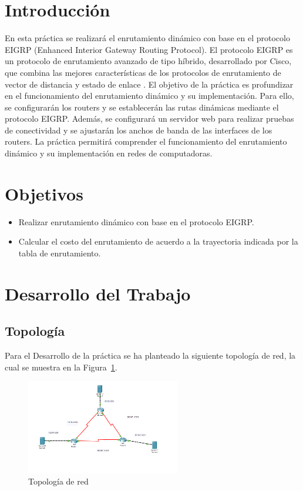 \setcounter{page}{1}


\section{Introducción}
    En esta práctica se realizará el enrutamiento dinámico con base en el protocolo EIGRP (Enhanced Interior Gateway Routing Protocol). El protocolo EIGRP es un protocolo de enrutamiento avanzado de tipo híbrido, desarrollado por Cisco, que combina las mejores características de los protocolos de enrutamiento de vector de distancia y estado de enlace\cite{cisco} . El objetivo de la práctica es profundizar en el funcionamiento del enrutamiento dinámico y su implementación. Para ello, se configurarán los routers y se establecerán las rutas dinámicas mediante el protocolo EIGRP. Además, se configurará un servidor web para realizar pruebas de conectividad y se ajustarán los anchos de banda de las interfaces de los routers. La práctica permitirá comprender el funcionamiento del enrutamiento dinámico y su implementación en redes de computadoras.
\section{Objetivos}
    \begin{itemize}
        \item Realizar enrutamiento dinámico con base en el protocolo EIGRP.
        \item Calcular el costo del enrutamiento de acuerdo a la trayectoria indicada por la tabla de enrutamiento.
    \end{itemize}

\section{Desarrollo del Trabajo}
    \subsection{Topología}
        Para el Desarrollo de la práctica se ha planteado la siguiente topología de red, la cual se muestra en la Figura~\ref{fig:topologia}.
    \begin{figure}[H]
        \centering
        \includegraphics[width=0.6\textwidth]{img/Topologia.png}
        \caption{Topología de red}
        \label{fig:topologia}
    \end{figure}

